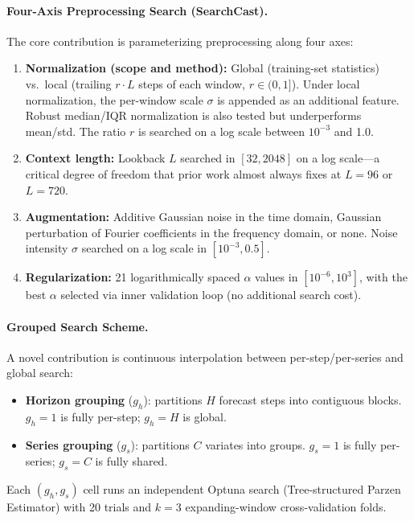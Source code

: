 \documentclass[11pt,a4paper]{article}
\begin{document}
\paragraph{Four-Axis Preprocessing Search (SearchCast).} The core contribution is parameterizing preprocessing along four axes:

\begin{enumerate}
\item \textbf{Normalization (scope and method):} Global (training-set statistics) vs.\ local (trailing $r \cdot L$ steps of each window, $r \in (0,1]$). Under local normalization, the per-window scale $\sigma$ is appended as an additional feature. Robust median/IQR normalization is also tested but underperforms mean/std. The ratio $r$ is searched on a log scale between $10^{-3}$ and 1.0.

\item \textbf{Context length:} Lookback $L$ searched in $[32, 2048]$ on a log scale---a critical degree of freedom that prior work almost always fixes at $L = 96$ or $L = 720$.

\item \textbf{Augmentation:} Additive Gaussian noise in the time domain, Gaussian perturbation of Fourier coefficients in the frequency domain, or none. Noise intensity $\sigma$ searched on a log scale in $[10^{-3}, 0.5]$.

\item \textbf{Regularization:} 21 logarithmically spaced $\alpha$ values in $[10^{-6}, 10^3]$, with the best $\alpha$ selected via inner validation loop (no additional search cost).
\end{enumerate}

\paragraph{Grouped Search Scheme.} A novel contribution is continuous interpolation between per-step/per-series and global search:
\begin{itemize}
\item \textbf{Horizon grouping} ($g_h$): partitions $H$ forecast steps into contiguous blocks. $g_h = 1$ is fully per-step; $g_h = H$ is global.
\item \textbf{Series grouping} ($g_s$): partitions $C$ variates into groups. $g_s = 1$ is fully per-series; $g_s = C$ is fully shared.
\end{itemize}
Each $(g_h, g_s)$ cell runs an independent Optuna search (Tree-structured Parzen Estimator) with 20 trials and $k = 3$ expanding-window cross-validation folds.
\end{document}
